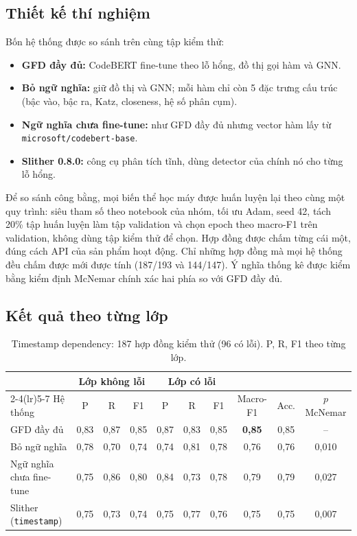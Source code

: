 \documentclass[12pt,a4paper]{article}
\newcommand{\code}[1]{\texttt{#1}}
\begin{document}
\subsection{Thiết kế thí nghiệm}
Bốn hệ thống được so sánh trên cùng tập kiểm thử:
\begin{itemize}
\item \textbf{GFD đầy đủ:} CodeBERT fine-tune theo lỗ hổng, đồ thị gọi hàm và GNN.
\item \textbf{Bỏ ngữ nghĩa:} giữ đồ thị và GNN; mỗi hàm chỉ còn 5 đặc trưng cấu trúc (bậc vào, bậc ra, Katz, closeness, hệ số phân cụm).
\item \textbf{Ngữ nghĩa chưa fine-tune:} như GFD đầy đủ nhưng vector hàm lấy từ \code{microsoft/codebert-base}.
\item \textbf{Slither 0.8.0:} công cụ phân tích tĩnh, dùng detector của chính nó cho từng lỗ hổng.
\end{itemize}
Để so sánh công bằng, mọi biến thể học máy được huấn luyện lại theo cùng một quy trình: siêu tham số theo notebook của nhóm, tối ưu Adam, seed 42, tách 20\% tập huấn luyện làm tập validation và chọn epoch theo macro-F1 trên validation, không dùng tập kiểm thử để chọn. Hợp đồng được chấm từng cái một, đúng cách API của sản phẩm hoạt động. Chỉ những hợp đồng mà mọi hệ thống đều chấm được mới được tính (187/193 và 144/147). Ý nghĩa thống kê được kiểm bằng kiểm định McNemar chính xác hai phía so với GFD đầy đủ.

\subsection{Kết quả theo từng lớp}
\begin{table}[H]\centering\small
\caption{Timestamp dependency: 187 hợp đồng kiểm thử (96 có lỗi). P, R, F1 theo từng lớp.}\label{tab:ts}
\setlength{\tabcolsep}{4pt}
\begin{tabular}{lccccccccc}
\toprule
 & \multicolumn{3}{c}{Lớp không lỗi} & \multicolumn{3}{c}{Lớp có lỗi} & & & \\
\cmidrule(lr){2-4}\cmidrule(lr){5-7}
Hệ thống & P & R & F1 & P & R & F1 & Macro-F1 & Acc. & $p$ McNemar\\
\midrule
GFD đầy đủ & 0{,}83 & 0{,}87 & 0{,}85 & 0{,}87 & 0{,}83 & 0{,}85 & \textbf{0{,}85} & 0{,}85 & --\\
Bỏ ngữ nghĩa & 0{,}78 & 0{,}70 & 0{,}74 & 0{,}74 & 0{,}81 & 0{,}78 & 0{,}76 & 0{,}76 & 0{,}010\\
Ngữ nghĩa chưa fine-tune & 0{,}75 & 0{,}86 & 0{,}80 & 0{,}84 & 0{,}73 & 0{,}78 & 0{,}79 & 0{,}79 & 0{,}027\\
Slither (\code{timestamp}) & 0{,}75 & 0{,}73 & 0{,}74 & 0{,}75 & 0{,}77 & 0{,}76 & 0{,}75 & 0{,}75 & 0{,}007\\
\bottomrule
\end{tabular}
\end{table}
\end{document}
